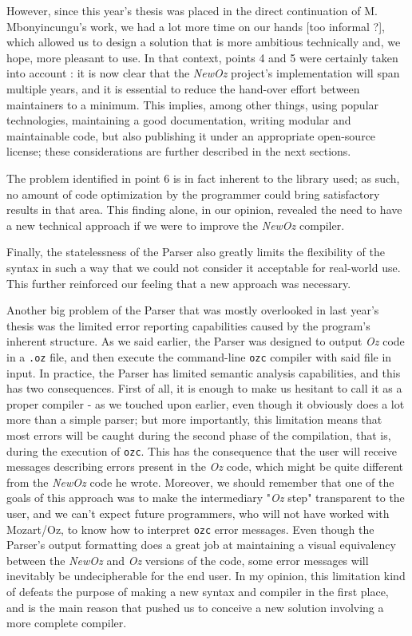 However, since this year's thesis was placed in the direct continuation of M. Mbonyincungu's work, we had a lot more time on our hands [too informal ?], which allowed us to design a solution that is more ambitious technically and, we hope, more pleasant to use.
In that context, points 4 and 5 were certainly taken into account : it is now clear that the \textit{NewOz} project's implementation will span multiple years, and it is essential to reduce the hand-over effort between maintainers to a minimum.
This implies, among other things, using popular technologies, maintaining a good documentation, writing modular and maintainable code, but also publishing it under an appropriate open-source license;
these considerations are further described in the next sections.\newline

The problem identified in point 6 is in fact inherent to the library used;
as such, no amount of code optimization by the programmer could bring satisfactory results in that area.
This finding alone, in our opinion, revealed the need to have a new technical approach if we were to improve the \textit{NewOz} compiler.\newline

Finally, the statelessness of the Parser also greatly limits the flexibility of the syntax in such a way that we could not consider it acceptable for real-world use.
This further reinforced our feeling that a new approach was necessary.\newline

Another big problem of the Parser that was mostly overlooked in last year's thesis was the limited error reporting capabilities caused by the program's inherent structure.
As we said earlier, the Parser was designed to output \textit{Oz} code in a \texttt{.oz} file, and then execute the command-line \texttt{ozc} compiler with said file in input.
In practice, the Parser has limited semantic analysis capabilities, and this has two consequences.
First of all, it is enough to make us hesitant to call it as a proper compiler - as we touched upon earlier, even though it obviously does a lot more than a simple parser;
but more importantly, this limitation means that most errors will be caught during the second phase of the compilation, that is, during the execution of \texttt{ozc}.
This has the consequence that the user will receive messages describing errors present in the \textit{Oz} code, which might be quite different from the \textit{NewOz} code he wrote.
Moreover, we should remember that one of the goals of this approach was to make the intermediary "\textit{Oz} step" transparent to the user, and we can't expect future programmers, who will not have worked with Mozart/Oz, to know how to interpret \texttt{ozc} error messages.
Even though the Parser's output formatting does a great job at maintaining a visual equivalency between the \textit{NewOz} and \textit{Oz} versions of the code, some error messages will inevitably be undecipherable for the end user.
In my opinion, this limitation kind of defeats the purpose of making a new syntax and compiler in the first place, and is the main reason that pushed us to conceive a new solution involving a more complete compiler.

